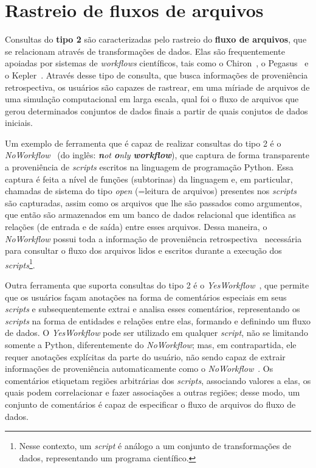 \section{Rastreio de fluxos de arquivos}%
\label{sec:rastreio-de-fluxos-de-arquivos}

Consultas do \textbf{tipo 2} são caracterizadas pelo rastreio do \textbf{fluxo de arquivos}, que se relacionam através de transformações de dados. Elas são frequentemente apoiadas por sistemas de \textit{workflows} científicos, tais como o Chiron~\cite{ogasawara2011algebraic}, o Pegasus~\cite{deelman2005pegasus} e o Kepler~\cite{ludascher2006scientific}. Através desse tipo de consulta, que busca informações de proveniência retrospectiva, os usuários são capazes de rastrear, em uma míriade de arquivos de uma simulação computacional em larga escala, qual foi o fluxo de arquivos que gerou determinados conjuntos de dados finais a partir de quais conjutos de dados iniciais.

Um exemplo de ferramenta que é capaz de realizar consultas do tipo 2 é o \textit{NoWorkflow}~\cite{murta2014noworkflow} (do inglês: \textit{\textbf{n}ot \textbf{o}nly \textbf{workflow}}), que captura de forma transparente a proveniência de \textit{scripts} escritos na linguagem de programação Python. Essa captura é feita a nível de funções (subtorinas) da linguagem e, em particular, chamadas de sistema do tipo \emph{open} (=leitura de arquivos) presentes nos \textit{scripts} são capturadas, assim como os arquivos que lhe são passados como argumentos, que então são armazenados em um banco de dados relacional que identifica as relações (de entrada e de saída) entre esses arquivos. Dessa maneira, o \textit{NoWorkflow} possui toda a informação de proveniência retrospectiva~\cite{Pimentel2016} necessária para consultar o fluxo dos arquivos lidos e escritos durante a execução dos \textit{scripts}\footnote{Nesse contexto, um \textit{script} é análogo a um conjunto de transformações de dados, representando um programa científico.}.

Outra ferramenta que suporta consultas do tipo 2 é o \textit{YesWorkflow}~\cite{mcphillips2015yesworkflow}, que permite que os usuários façam anotações na forma de comentários especiais em seus \textit{scripts} e subsequentemente extrai e analisa esses comentários, representando os \textit{scripts} na forma de entidades e relações entre elas, formando e definindo um fluxo de dados. O \textit{YesWorkflow} pode ser utilizado em qualquer \textit{script}, não se limitando somente a Python, diferentemente do \textit{NoWorkflow}; mas, em contrapartida, ele requer anotações explícitas da parte do usuário, não sendo capaz de extrair informações de proveniência automaticamente como o \textit{NoWorkflow}~\cite{Pimentel2016}. Os comentários etiquetam regiões arbitrárias dos \textit{scripts}, associando valores a elas, os quais podem correlacionar e fazer associações a outras regiões; desse modo, um conjunto de comentários é capaz de especificar o fluxo de arquivos do fluxo de dados.

